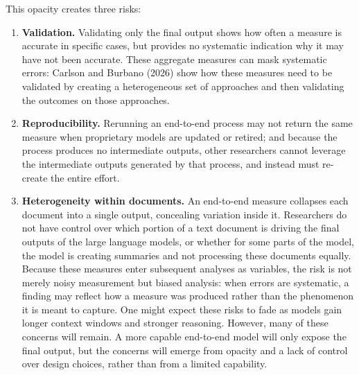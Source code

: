 \documentclass[11pt]{article}
\begin{document}
This opacity creates three risks:
\begin{enumerate}
    \item \textbf{Validation.} Validating only the final output shows how often a measure is accurate in specific cases, but provides no systematic indication why it may have not been accurate. These aggregate measures can mask systematic errors: Carlson and Burbano (2026) show how these measures need to be validated by creating a heterogeneous set of approaches and then validating the outcomes on those approaches.
    \item \textbf{Reproducibility.} Rerunning an end-to-end process may not return the same measure when proprietary models are updated or retired; and because the process produces no intermediate outputs, other researchers cannot leverage the intermediate outputs generated by that process, and instead must re-create the entire effort.
    \item \textbf{Heterogeneity within documents.} An end-to-end measure collapses each document into a single output, concealing variation inside it. Researchers do not have control over which portion of a text document is driving the final outputs of the large language models, or whether for some parts of the model, the model is creating summaries and not processing these documents equally. Because these measures enter subsequent analyses as variables, the risk is not merely noisy measurement but biased analysis: when errors are systematic, a finding may reflect how a measure was produced rather than the phenomenon it is meant to capture. One might expect these risks to fade as models gain longer context windows and stronger reasoning. However, many of these concerns will remain. A more capable end-to-end model will only expose the final output, but the concerns will emerge from opacity and a lack of control over design choices, rather than from a limited capability.
\end{enumerate}
\end{document}

